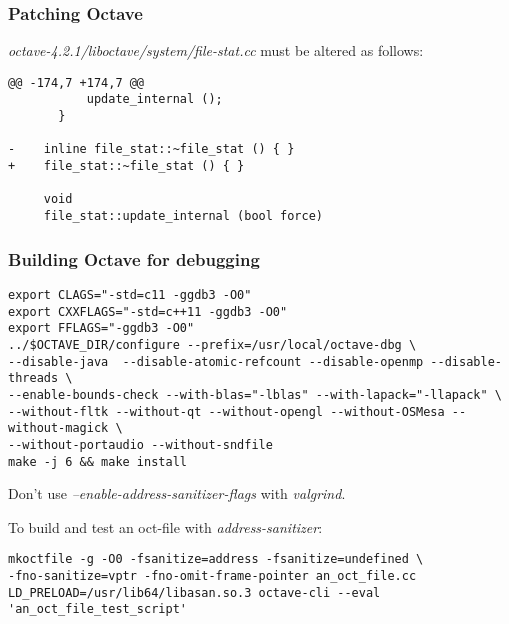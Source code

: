 \documentclass[a4paper,twoside,10pt,english]{report}
\begin{document}
\subsubsection*{Patching Octave}
\emph{octave-4.2.1/liboctave/system/file-stat.cc} must be altered as follows:
\begin{small}
\begin{verbatim}
@@ -174,7 +174,7 @@
           update_internal ();
       }
 
-    inline file_stat::~file_stat () { }
+    file_stat::~file_stat () { }
 
     void
     file_stat::update_internal (bool force)
\end{verbatim}
\end{small}
\subsubsection*{Building Octave for debugging}
\begin{small}
\begin{verbatim}
export CLAGS="-std=c11 -ggdb3 -O0"
export CXXFLAGS="-std=c++11 -ggdb3 -O0"
export FFLAGS="-ggdb3 -O0"
../$OCTAVE_DIR/configure --prefix=/usr/local/octave-dbg \
--disable-java  --disable-atomic-refcount --disable-openmp --disable-threads \
--enable-bounds-check --with-blas="-lblas" --with-lapack="-llapack" \
--without-fltk --without-qt --without-opengl --without-OSMesa --without-magick \
--without-portaudio --without-sndfile
make -j 6 && make install
\end{verbatim}
\end{small}

Don't use \emph{--enable-address-sanitizer-flags} with \emph{valgrind}.

To build and test an oct-file with \emph{address-sanitizer}:
\begin{small}
\begin{verbatim}
mkoctfile -g -O0 -fsanitize=address -fsanitize=undefined \
-fno-sanitize=vptr -fno-omit-frame-pointer an_oct_file.cc
LD_PRELOAD=/usr/lib64/libasan.so.3 octave-cli --eval 'an_oct_file_test_script'
\end{verbatim}
\end{small}
\end{document}
